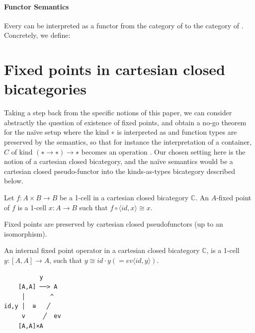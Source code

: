 \paragraph*{Functor Semantics}

Every \;\AgdaSymbol{:}\;\;\AgdaSymbol{(}\;\;\AgdaSymbol{)} can be interpreted as a functor from the category of  \; to the category of \;. Concretely, we define:



\section{Fixed points in cartesian closed bicategories}

Taking a step back from the specific notions of this paper, we can consider abstractly the question of existence of fixed points, and obtain a no-go theorem for the naïve setup where the kind ∗ is interpreted as  and function types are preserved by the semantics, so that for instance the interpretation of a container, $C$ of kind $(∗ → ∗) → ∗$ becomes an operation \AgdaSymbol{(}\;\;\AgdaSymbol{)}\;\;. Our chosen setting here is the notion of a cartesian closed bicategory, and the naïve semantics would be a cartesian closed pseudo-functor into the kinds-as-types bicategory described below.

\begin{definition}
Let $f : A×B → B$ be a 1-cell in a cartesian closed bicategory $ℂ$. An $A$-fixed point of $f$ is a 1-cell $x : A → B$ such that $f ∘ 〈id , x 〉≅ x$.
\end{definition}

\begin{lemma}
Fixed points are preserved by cartesian closed pseudofunctors (up to an isomorphism).
\end{lemma}

\begin{definition}
An internal fixed point operator in a cartesian closed bicategory $ℂ$, is a 1-cell $y : [A,A] → A$, such that $y ≅ id · y (= ev 〈 id  , y 〉)$.
\end{definition}

\begin{verbatim}
          y
    [A,A] ──> A
     │       ^
id,y │  ≅   ╱
     v     ╱  ev
    [A,A]×A
\end{verbatim}

